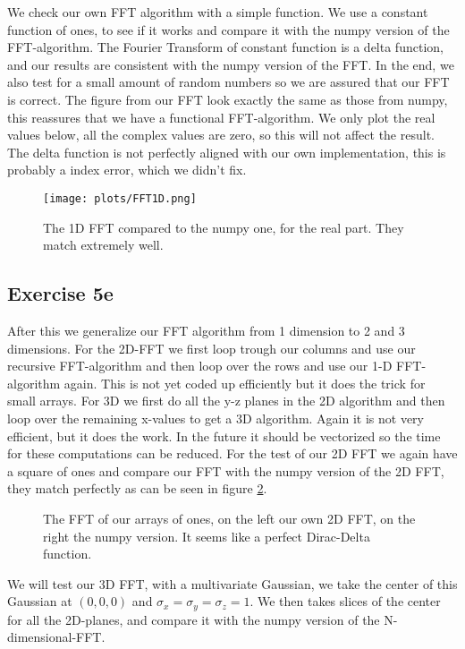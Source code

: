 We check our own FFT algorithm with a simple function. We use a constant function of ones, to see if it works and compare it with the numpy version of the FFT-algorithm. The Fourier Transform of  constant function is a delta function, and our results are consistent with the numpy version of the FFT. In the end, we also test for a small amount of random numbers so we are assured that our FFT is correct. The figure  from our FFT look exactly the same as those from numpy, this reassures that we have a functional FFT-algorithm. We only plot the real values below, all the complex values are zero, so this will not affect the result. The delta function is not perfectly aligned with our own implementation, this is probably a index error, which we didn't fix.
\begin{figure}
    \centering
    \texttt{[image: plots/FFT1D.png]}
    \caption{The 1D FFT compared to the numpy one, for the real part. They match extremely well.}
    \label{fig:my_label}
\end{figure}


\subsection{Exercise 5e}
After this we generalize our FFT algorithm from 1 dimension to 2 and 3 dimensions. For the 2D-FFT we first loop trough our columns and use our recursive FFT-algorithm and then loop over the rows and use our 1-D FFT-algorithm again. This is not yet coded up efficiently but it does the trick for small arrays. For 3D we first do all the y-z planes in the 2D algorithm and then loop over the remaining x-values to get a 3D algorithm. Again it is not very efficient, but it does the work. In the future it should be vectorized so the time for these computations can be reduced. For the test of our 2D FFT we again have a square of ones and compare our FFT with the numpy version of the 2D FFT, they match perfectly as can be seen in figure \ref{2dfft}.

 \begin{figure}
    \centering
    \qquad
    \caption{The FFT of our arrays of ones, on the left our own 2D FFT, on the right the numpy version. It seems like a perfect Dirac-Delta function.}
    \label{2dfft}
  \end{figure}

We will test our 3D FFT, with a multivariate Gaussian, we take the center of this Gaussian at $(0,0,0)$ and $\sigma_x=\sigma_y=\sigma_z=1$. We then takes slices of the center for all the 2D-planes, and compare it with the numpy version of the N-dimensional-FFT.



